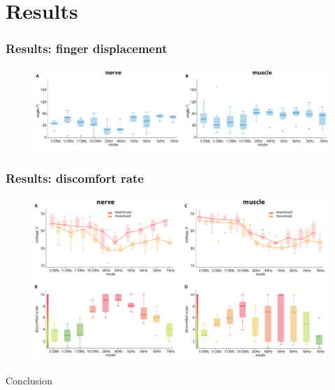 \documentclass[12pt, aspectratio=169]{beamer}
\begin{document}
\section{Results}
\begin{frame}
  \frametitle{Results: finger displacement}
  \begin{figure}
    \includegraphics[width=1.0\linewidth]{angles_all}
  \end{figure}
\end{frame}
\begin{frame}
  \frametitle{Results: discomfort rate}
  \begin{figure}
    \includegraphics[width=0.9\linewidth]{threshold_angle}
  \end{figure}
\end{frame}
Conclusion
\end{document}
